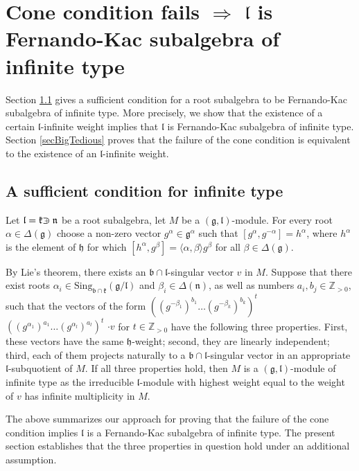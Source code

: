 \documentclass[12pt]{report}
\newcommand {\ZZ} {\mathbb {Z}}
\newcommand{\kk}{\mathfrak{k}}
\newcommand{\nn}{\mathfrak{n}}
\newcommand{\hh}{\mathfrak{h}}
\newcommand{\gG}{\mathfrak{g}}
\newcommand{\bb}{\mathfrak{b}}
\newcommand{\lL}{\mathfrak{l}}
\newcommand{\hw}{\mathrm{Sing}}
\def\crplus{\hbox{$\supset${\raise1.05pt\hbox{\kern -0.60em ${\scriptscriptstyle +}$}}\ }}
\begin{document}
\chapter{Cone condition fails $\Rightarrow$ $\lL$ is Fernando-Kac subalgebra of infinite type}\label{chapterConeConditionFails-NoFKFT}
Section \ref{secConeIntersections} gives a sufficient condition for a root subalgebra to be Fernando-Kac subalgebra of infinite type. More precisely, we show that the existence of a certain $\lL$-infinite weight implies that $\lL$ is Fernando-Kac subalgebra of infinite type. Section \ref{secBigTedious} proves that the failure of the cone condition is equivalent to the existence of an $\lL$-infinite weight. 
\section{A sufficient condition for infinite type}
\label{secConeIntersections}
Let $\lL=\kk\crplus\nn$ be a root subalgebra, let $M$ be a $(\gG,\lL)$-module. For every root $\alpha\in\Delta(\gG)$ choose a non-zero vector $g^\alpha\in\gG^\alpha$ such that $[g^{\alpha},g^{-\alpha}]=h^\alpha$, where $h^{\alpha}$ is the element of $\hh$ for which $[h^{\alpha},g^\beta]=\langle\alpha,\beta \rangle g^{\beta}$ for all $\beta\in\Delta(\gG)$.

By Lie's theorem, there exists an $\bb\cap\lL$-singular vector $v$ in $M$. Suppose that there exist roots $\alpha_i\in\hw_{\bb\cap\kk}(\gG/\lL)$ and $\beta_i\in\Delta(\nn)$, as well as numbers $a_i,b_j\in\ZZ_{>0}$, such that the vectors of the form $\left((g^{-\beta_1})^{b_1}\dots (g^{-\beta_k})^{b_k}\right)^t$ $\left((g^{\alpha_1})^{a_1}\dots (g^{\alpha_l})^{a_l}\right)^t$  $\cdot v $ for $t\in\ZZ_{>0}$ have the following three properties. First, these vectors have the same $\hh$-weight; second, they are linearly independent; third, each of them projects naturally to a $\bb\cap\lL$-singular vector in an appropriate $\lL$-subquotient of $M$. If all three properties hold, then $M$ is a $(\gG,\lL)$-module of infinite type as the irreducible $\lL$-module with highest weight equal to the weight of $v$ has infinite multiplicity in $M$.

The above summarizes our approach for proving that the failure of the cone condition implies $\lL$ is a Fernando-Kac subalgebra of infinite type. 
The present section establishes that the three properties in question hold under an additional assumption.
\end{document}
